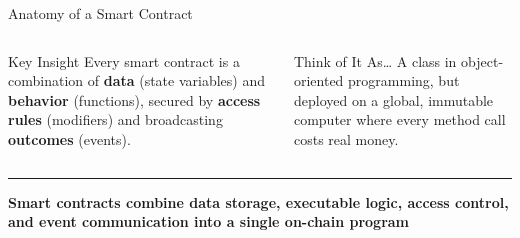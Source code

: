 \documentclass[8pt,aspectratio=169]{beamer}
\newcommand{\bottomnote}[1]{\vfill\vspace{-2mm}\textcolor{mllavender2}{\rule{\textwidth}{0.4pt}}\vspace{1mm}\footnotesize\textbf{#1}}
\begin{document}
\begin{frame}{Anatomy of a Smart Contract}
\vspace{2mm}
\begin{columns}[T]
\begin{block}{Key Insight}
\footnotesize
Every smart contract is a combination of \textbf{data} (state variables) and \textbf{behavior} (functions), secured by \textbf{access rules} (modifiers) and broadcasting \textbf{outcomes} (events).
\end{block}
\begin{exampleblock}{Think of It As\ldots}
\footnotesize
A class in object-oriented programming, but deployed on a global, immutable computer where every method call costs real money.
\end{exampleblock}
\end{columns}
\bottomnote{Smart contracts combine data storage, executable logic, access control, and event communication into a single on-chain program}
\end{frame}
\end{document}
